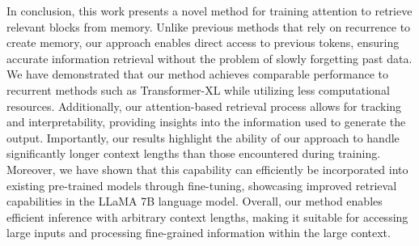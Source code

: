 In conclusion, this work presents a novel method for training attention to retrieve relevant blocks from memory. Unlike previous methods that rely on recurrence to create memory, our approach enables direct access to previous tokens, ensuring accurate information retrieval without the problem of slowly forgetting past data. We have demonstrated that our method achieves comparable performance to recurrent methods such as Transformer-XL while utilizing less computational resources. Additionally, our attention-based retrieval process allows for tracking and interpretability, providing insights into the information used to generate the output. Importantly, our results highlight the ability of our approach to handle significantly longer context lengths than those encountered during training. Moreover, we have shown that this capability can efficiently be incorporated into existing pre-trained models through fine-tuning, showcasing improved retrieval capabilities in the LLaMA 7B language model. Overall, our method enables efficient inference with arbitrary context lengths, making it suitable for accessing large inputs and processing fine-grained information within the large context.


